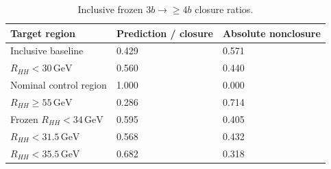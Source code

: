 \begin{table}[tb]
  \centering
  \footnotesize
  \caption{Inclusive frozen $3b\rightarrow{\geq4b}$ closure ratios.}
  \label{tab:transfer-closure-ratios}
  \begin{tabular}{lll}
    \toprule
    Target region & Prediction / closure & Absolute nonclosure \\
    \midrule
    Inclusive baseline & 0.429 & 0.571 \\
    $R_{HH}<30\,\mathrm{GeV}$ & 0.560 & 0.440 \\
    Nominal control region & 1.000 & 0.000 \\
    $R_{HH}\geq55\,\mathrm{GeV}$ & 0.286 & 0.714 \\
    Frozen $R_{HH}<34\,\mathrm{GeV}$ & 0.595 & 0.405 \\
    $R_{HH}<31.5\,\mathrm{GeV}$ & 0.568 & 0.432 \\
    $R_{HH}<35.5\,\mathrm{GeV}$ & 0.682 & 0.318 \\
    \bottomrule
  \end{tabular}
\end{table}
